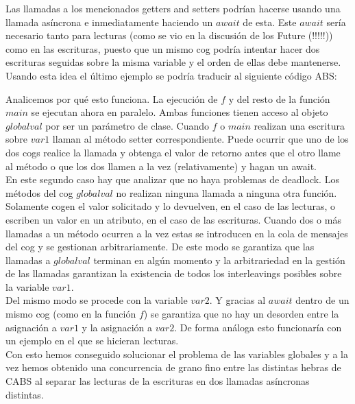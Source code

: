 Las llamadas a los mencionados getters and setters podrían hacerse usando una llamada asíncrona e inmediatamente haciendo un $await$ de esta. Este $await$ sería necesario tanto para lecturas (como se vio en la discusión de los Future (!!!!!)) como en las escrituras, puesto que un mismo cog podría intentar hacer dos escrituras seguidas sobre la misma variable y el orden de ellas debe mantenerse.\\

Usando esta idea el último ejemplo se podría traducir al siguiente código ABS:



Analicemos por qué esto funciona. La ejecución de $f$ y del resto de la función $main$ se ejecutan ahora en paralelo. Ambas funciones tienen acceso al objeto $globalval$ por ser un parámetro de clase. Cuando $f$ o $main$ realizan una escritura sobre $var1$ llaman al método setter correspondiente. Puede ocurrir que uno de los dos cogs realice la llamada y obtenga el valor de retorno antes que el otro llame al método o que los dos llamen a la vez (relativamente) y hagan un await.\\

En este segundo caso hay que analizar que no haya problemas de deadlock. Los métodos del cog $globalval$ no realizan ninguna llamada a ninguna otra función. Solamente cogen el valor solicitado y lo devuelven, en el caso de las lecturas, o escriben un valor en un atributo, en el caso de las escrituras. Cuando dos o más llamadas a un método ocurren a la vez estas se introducen en la cola de mensajes del cog y se gestionan arbitrariamente. De este modo se garantiza que las llamadas a $globalval$ terminan en algún momento y la arbitrariedad en la gestión de las llamadas garantizan la existencia de todos los interleavings posibles sobre la variable $var1$.\\

Del mismo modo se procede con la variable $var2$. Y gracias al $await$ dentro de un mismo cog (como en la función $f$) se garantiza que no hay un desorden entre la asignación a $var1$ y la asignación a $var2$. De forma análoga esto funcionaría con un ejemplo en el que se hicieran lecturas.\\

Con esto hemos conseguido solucionar el problema de las variables globales y a la vez hemos obtenido una concurrencia de grano fino entre las distintas hebras de CABS al separar las lecturas de la escrituras en dos llamadas asíncronas distintas.

